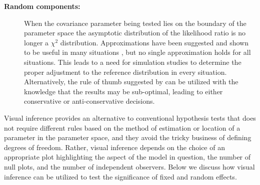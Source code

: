 \documentclass[12pt]{article} %
\newcommand{\al}[1]{{\color{ForestGreen} #1}}
\newcommand{\alnote}[1]{\todo[inline,color=green!40]{#1}} %
\newcommand{\hhnote}[1]{\todo[inline,color=orange!40]{#1}}
\begin{document}
\begin{description}
%
\item[\bf Random components: ] When the covariance parameter being tested lies on the boundary of the parameter space the asymptotic distribution of the likelihood ratio is no longer a $\chi^2$ distribution. Approximations have been suggested and shown to be useful in many situations \citep{Stram:1994wd, Morrell:1998ua}, but no single approximation holds for all situations. This leads to a need for simulation studies to determine the proper adjustment to the reference distribution in every situation. \al{Alternatively,} the rule of thumb suggested by \citeauthor{Stram:1994wd} \al{can be utilized} with the knowledge that the results may be sub-optimal, leading to either conservative or anti-conservative decisions. 
\end{description}


Visual inference provides an alternative to conventional hypothesis tests that does not require different rules based on the method of estimation or location of a parameter in the parameter space, and they avoid the tricky business of defining degrees of freedom. Rather, visual inference depends on the choice of an appropriate plot highlighting the aspect of the model in question, the number of null plots, and the number of independent observers. Below we discuss how visual inference can be utilized to test the significance of fixed and random effects.
\end{document}
